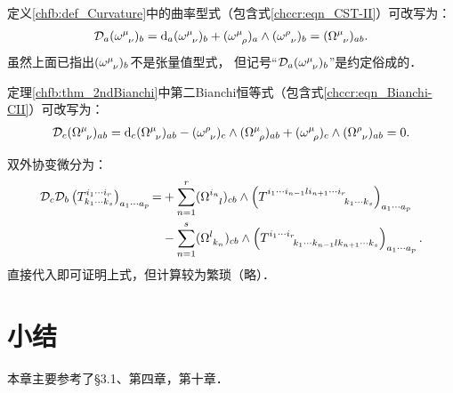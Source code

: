 \begin{example}	
	定义\ref{chfb:def_Curvature}中的曲率型式（包含式\eqref{chccr:eqn_CST-II}）可改写为：
	\begin{align}
		\mathcal{D}_a ( \omega _{\hphantom{\mu} \nu}^\mu )_b = 
		{\rm d}_a ( \omega _{\hphantom{\mu} \nu}^\mu )_b  +  (\omega _{\hphantom{\mu} \rho}^\mu)_a
		\wedge ( \omega _{\hphantom{\mu} \nu}^\rho )_b = (\Omega_{\hphantom{\mu} \nu} ^{\mu})_{ab} .  
	\end{align}
	虽然上面已指出$( \omega _{\hphantom{\mu} \nu}^\mu )_b$不是张量值型式，
	但记号“$\mathcal{D}_a ( \omega _{\hphantom{\mu} \nu}^\mu )_b$”是约定俗成的．
\end{example}


\begin{example}	
定理\ref{chfb:thm_2ndBianchi}中第二Bianchi恒等式（包含式\eqref{chccr:eqn_Bianchi-CII}）可改写为：
	\begin{align}
		\mathcal{D}_c (\Omega_{\hphantom{a} \nu} ^{\mu})_{ab} =
		{\rm d}_c (\Omega_{\hphantom{a} \nu} ^{\mu})_{ab}  -  ( \omega _{\hphantom{a} \nu}^\rho )_c
		\wedge (\Omega_{\hphantom{a} \rho} ^{\mu})_{ab} + (\omega _{\hphantom{a} \rho}^\mu )_{c}
		\wedge	( \Omega_{\hphantom{a} \nu} ^{\rho} )_{ab} =0.  
	\end{align}
\end{example}

\begin{example}
双外协变微分为：
\begin{align}
	\mathcal{D}_c\mathcal{D}_b \left(T^{i_1 \cdots i_r}_{
		k_1\cdots k_s}\right)_{a_1 \cdots a_p} {=} 
	&+ \sum_{n=1}^{r} (\Omega^{i_n}_{\hphantom{i_n}l})_{cb} \wedge
	\left(T^{i_1 \cdots i_{n-1} l i_{n+1} \cdots i_r}
	_{\hphantom{i_1 \cdots i_{n-1} l i_{n+1} \cdots i_r}k_1\cdots k_s}\right)_{a_1 \cdots a_p} \notag  \\
	&-\sum_{n=1}^{s} (\Omega^{l}_{\hphantom{l}k_n})_{cb} \wedge
	\left(T^{i_1 \cdots i_r}_{\hphantom{i_1 \cdots i_r}
		k_1\cdots k_{n-1} l k_{n+1}\cdots k_s}\right)_{a_1 \cdots a_p} . \label{chfb:eqn_DDpform}
\end{align}
直接代入即可证明上式，但计算较为繁琐（略）．
\end{example}








\section*{小结}
本章主要参考了\parencite{cc2001-zh}\S 3.1、第四章，\parencite{chen-li-2026-2ed-v2}第十章．


